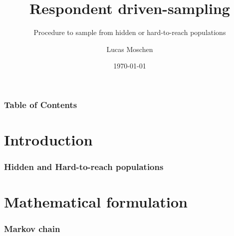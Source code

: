 \documentclass{beamer}
\title[Respondent driven-sampling]
{Respondent driven-sampling}
\subtitle{Procedure to sample from hidden or hard-to-reach populations}
\author[Lucas Moschen]
{Lucas Moschen}
\institute[EMAp/FGV]
{
  School of Applied Mathematics\\
  Fundação Getulio Vargas
}
\date[\today]
{\today}
\begin{document}
\frame{\titlepage}

\begin{frame}
\frametitle{Table of Contents}
\tableofcontents
\end{frame}

\section{Introduction}

\begin{frame}
\frametitle{Hidden and Hard-to-reach populations}


\end{frame}


\section{Mathematical formulation}

\begin{frame}
\frametitle{Markov chain}

\end{frame}
\end{document}
